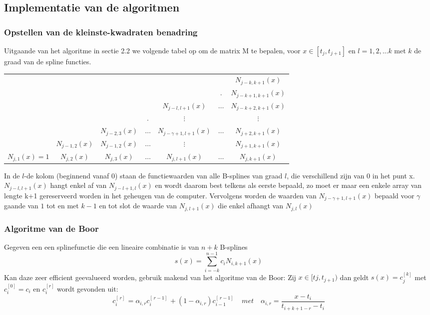 \documentclass[a4paper]{article}
\begin{document}
\subsection{Implementatie van de algoritmen}
\subsubsection{Opstellen van de kleinste-kwadraten benadring}
Uitgaande van het algoritme in sectie 2.2 we volgende tabel op om de matrix M te bepalen, voor $x \in [t_j, t_{j+1}]$ en $l=1, 2, ... k$ met $k$ de graad van de spline functies.
\begin{table}[H]
	\centering
	\begin{tabular}{| c c c c c c c  |}
		\hline
		& & & & & & $N_{j-k,k+1}(x)$ \\
		& & & & & . & $N_{j-k+1,k+1}(x)$ \\
		& & & & $N_{j-l,l+1}(x)$ & $\hdots$ & $N_{j-k+2,k+1}(x)$ \\
		& & & . & $\vdots$  & & $\vdots$\\
		& & $N_{j-2,3}(x)$ & $\hdots$ & $N_{j-\gamma+1,l+1}(x)$ & $\hdots$ & $N_{j+2,k+1}(x)$   \\
		& $N_{j-1,2}(x)$ & $N_{j-1,2}(x)$ & $\hdots$ & $\vdots$ &  &$N_{j+1,k+1}(x)$ \\
		$N_{j,1}(x) = 1$ & $N_{j,2}(x)$ & $N_{j,3}(x)$ & $\hdots$ & $N_{j,l+1}(x)$ & $\hdots$ & $N_{j,k+1}(x)$ \\ 
		\hline
	\end{tabular}
\end{table}
In de $l$-de kolom (beginnend vanaf 0) staan de functiewaarden van alle B-splines van graad $l$, die verschillend zijn van 0 in het punt x. 
$N_{j-l,l+1}(x)$ hangt enkel af van $N_{j-l+1,l}(x)$ en wordt daarom best telkens als eerste bepaald, zo moet er maar een enkele array van lengte k+1 gereserveerd worden in het geheugen van de computer. Vervolgens worden de waarden van $N_{j-\gamma+1,l+1}(x)$ bepaald voor $\gamma$ gaande van $1$ tot en met $k-1$ en tot slot de waarde van $N_{j,l+1}(x)$ die enkel afhangt van $N_{j,l}(x)$
\newpage

\newpage

\subsubsection{Algoritme van de Boor}
Gegeven een een splinefunctie die een lineaire combinatie is van $n+k$ B-splines
\begin{equation}\label{eq:deboor}
	s(x) = \sum\limits_{i=-k}^{n-1} c_iN_{i, k+1}(x)
\end{equation}
Kan daze zeer efficient geevalueerd worden, gebruik makend van het algoritme van de Boor:
Zij $x\in[t{j}, t_{j+1})$ dan geldt $s(x)=c_{j}^{[k]}$ met $c_i^{[0]} = c_i$ en $c_i^{[r]}$ wordt gevonden uit:
\begin{equation}\label{eq:deboorcoef}
	c_i^{[\, r]\, } = \alpha_{i,r} c_i^{[\, r-1]\, } + (1-\alpha_{i,r})c_{i-1}^{[\, r-1]\, } \quad met \quad \alpha_{i,r} = \frac{x-t_i}{t_{i+k+1-r}-t_i}
\end{equation}
\end{document}

